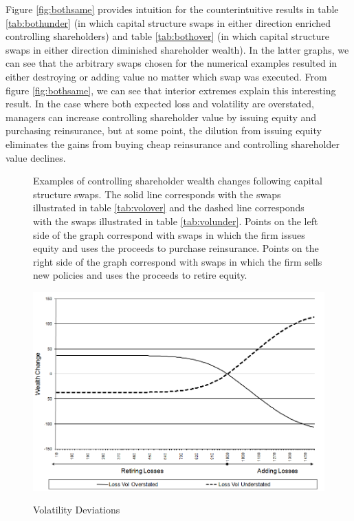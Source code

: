 Figure \ref{fig:bothsame} provides intuition for the counterintuitive results in table \ref{tab:bothunder} (in which capital structure swaps in either direction enriched controlling shareholders) and table \ref{tab:bothover} (in which capital structure swaps in either direction diminished shareholder wealth).  In the latter graphs, we can see that the arbitrary swaps chosen for the numerical examples resulted in either destroying or adding value no matter which swap was executed.  From figure \ref{fig:bothsame}, we can see that interior extremes explain this interesting result.  In the case where both expected loss and volatility are overstated, managers can increase controlling shareholder value by issuing equity and purchasing reinsurance, but at some point, the dilution from issuing equity eliminates the gains from buying cheap reinsurance and controlling shareholder value declines.

\begin{figure}\caption{Volatility Deviations\label{fig:volover}}
\begin{small}Examples of controlling shareholder wealth changes following capital structure swaps.  The solid line corresponds with the swaps illustrated in table \ref{tab:volover} and the dashed line corresponds with the swaps illustrated in table \ref{tab:volunder}.  Points on the left side of the graph correspond with swaps in which the firm issues equity and uses the proceeds to purchase reinsurance.  Points on the right side of the graph correspond with swaps in which the firm sells new policies and uses the proceeds to retire equity.\end{small}
\begin{center}
{\includegraphics[type=png,ext=.png,read=.png,width=4.8in]{volover}}
\end{center}
\end{figure}

